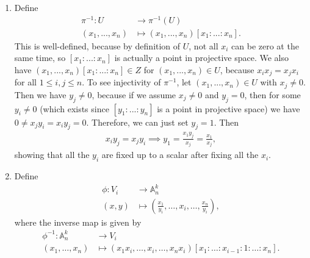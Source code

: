 \newcommand{\sheet}{3}




\maketitle{}

\begin{exercise}{1}
    \begin{enumerate}
        \item Define 
        \begin{align*}
            \pi^{-1}:U &\longrightarrow \pi^{-1}(U) \\
            (x_1,...,x_n)  &\mapsto (x_1,...,x_n)[x_1:...:x_n].
        \end{align*}
        This is well-defined, because by definition of $U$, not all
        $x_i$ can be zero at the same time, so $[x_1:...:x_n]$ is actually a
        point in projective space. We also have 
            $(x_1,...,x_n)[x_1:...:x_n]\in Z$ for $(x_1,...,x_n)\in U$,
            because $x_ix_j=x_jx_i$ for all $1\leq i,j \leq n.$
            To see injectivity of $\pi^{-1}$, let
            $(x_1,...,x_n)\in U$ with $x_j\not = 0$. Then we have $y_j\not = 0$, because
            if we assume $x_j\not =0$ and $y_j=0$, then for some $y_i\not =0$ 
            (which exists since $[y_1:...:y_n]$ is a point in projective space) 
            we have $0\not = x_jy_i= x_iy_j=0.$
            Therefore, we can just set $y_j=1$. Then 
            \begin{align*}
                x_iy_j=x_jy_i \implies y_1=\frac{x_1y_j}{x_j}=\frac{x_1}{x_j},
            \end{align*}
            showing that all the $y_i$ are fixed up to a scalar after fixing all the $x_i$.
        \item    
            Define 
            \begin{align*}
                \phi: V_i &\to \mathbb{A}_n^k\\
                (x,y)&\mapsto (\frac{x_1}{y_i},\dots, x_i,\dots,\frac{x_n}{y_i}),
            \end{align*}
            where the inverse map is given by 
            \begin{align*}
                \phi^{-1}:\mathbb{A}_n^k &\to V_i\\
                (x_1,\dots,x_n)&\mapsto (x_1x_i,\dots,x_i,\dots,x_nx_i)[x_1:\dots:x_{i-1}:1:\dots:x_n].
            \end{align*}
    \end{enumerate}
\end{exercise}

